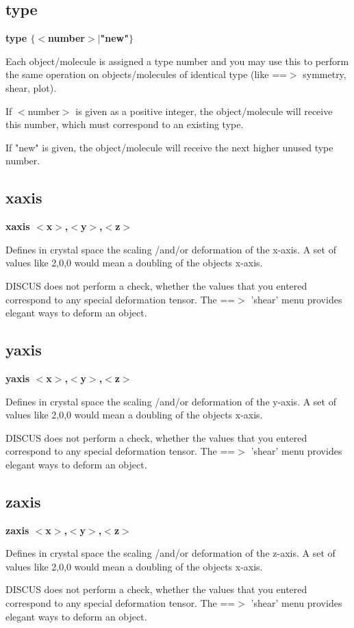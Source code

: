 \subsection*{type}
{\bf type $ \{$$ <$number$> $$| $"new"$\} $ \par }
\par
\vspace{3pt}
Each object/molecule is assigned a type number and you may use this 
to perform the same operation on objects/molecules of identical 
type (like ==$> $ symmetry, shear, plot). 
\par
If $ <$number$> $ is given as a positive integer, the object/molecule will 
receive this number, which must correspond to an existing type. 
\par
If "new" is given, the object/molecule will receive the next higher 
unused type number. 
\subsection*{xaxis}
{\bf xaxis  $ <$x$> $,$ <$y$> $,$ <$z$> $ \par }
\par
\vspace{3pt}
Defines in crystal space the scaling /and/or deformation of the 
x-axis. A set of values like 2,0,0 would mean a doubling of the 
objects x-axis. 
\par
DISCUS does not perform a check, whether the values that you 
entered correspond to any special deformation tensor. The 
==$> $ 'shear' menu provides elegant ways to deform an object. 
\subsection*{yaxis}
{\bf yaxis  $ <$x$> $,$ <$y$> $,$ <$z$> $ \par }
\par
\vspace{3pt}
Defines in crystal space the scaling /and/or deformation of the 
y-axis. A set of values like 2,0,0 would mean a doubling of the 
objects x-axis. 
\par
DISCUS does not perform a check, whether the values that you 
entered correspond to any special deformation tensor. The 
==$> $ 'shear' menu provides elegant ways to deform an object. 
\subsection*{zaxis}
{\bf zaxis  $ <$x$> $,$ <$y$> $,$ <$z$> $ \par }
\par
\vspace{3pt}
Defines in crystal space the scaling /and/or deformation of the 
z-axis. A set of values like 2,0,0 would mean a doubling of the 
objects x-axis. 
\par
DISCUS does not perform a check, whether the values that you 
entered correspond to any special deformation tensor. The 
==$> $ 'shear' menu provides elegant ways to deform an object. 
